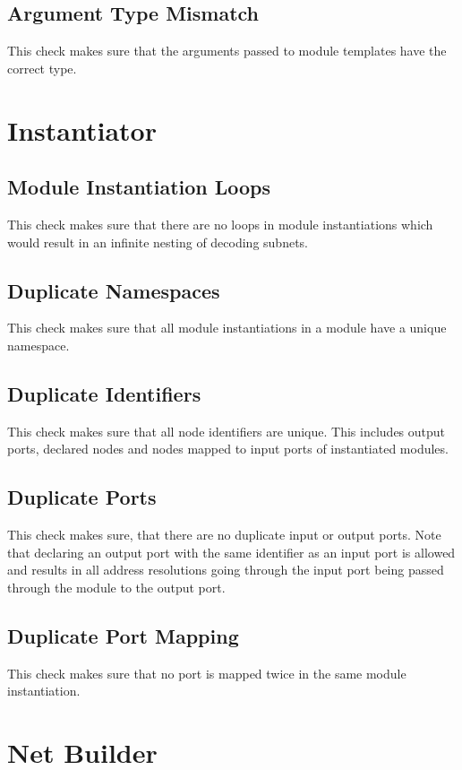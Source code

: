 \documentclass[a4paper,11pt,twoside]{report}
\begin{document}
{{{\subsection{Argument Type Mismatch}
This check makes sure that the arguments passed to module templates have the correct type.

\section{Instantiator}
\subsection{Module Instantiation Loops}
This check makes sure that there are no loops in module instantiations which would result in an infinite nesting of decoding subnets.

\subsection{Duplicate Namespaces}
This check makes sure that all module instantiations in a module have a unique namespace.

\subsection{Duplicate Identifiers}
This check makes sure that all node identifiers are unique.
This includes output ports, declared nodes and nodes mapped to input ports of instantiated modules.

\subsection{Duplicate Ports}
This check makes sure, that there are no duplicate input or output ports.
Note that declaring an output port with the same identifier as an input port is allowed and results in all address resolutions going through the input port being passed through the module to the output port.

\subsection{Duplicate Port Mapping}
This check makes sure that no port is mapped twice in the same module instantiation.

\section{Net Builder}

}}}
\end{document}
